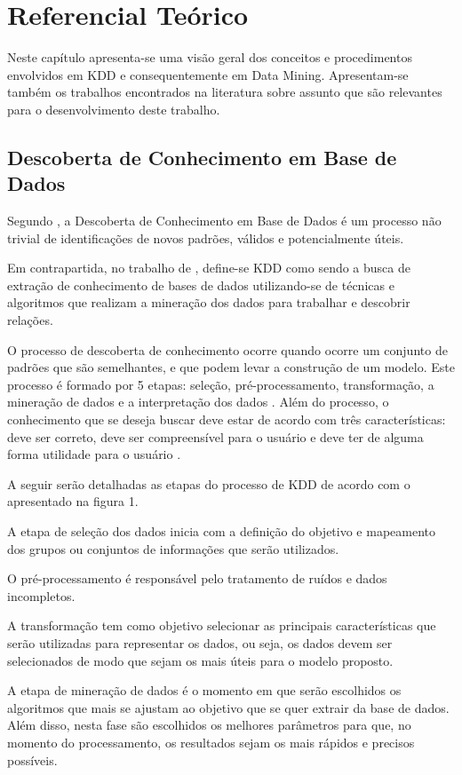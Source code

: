 \documentclass[
	12pt,				%
	openright,			%
	oneside,	
	a4paper,				%
	english,				%
	brazil				%
]{abntex2/abntex2} %
\begin{document}
\chapter{Referencial Teórico}

Neste capítulo apresenta-se uma visão geral dos conceitos e procedimentos envolvidos em KDD e consequentemente em Data Mining. Apresentam-se também os trabalhos encontrados na literatura sobre assunto que são relevantes para o desenvolvimento deste trabalho.

	\section{Descoberta de Conhecimento em Base de Dados}
	
	Segundo \cite{fayyad:1996}, a Descoberta de Conhecimento em Base de Dados é um processo não trivial de identificações de novos padrões, válidos e potencialmente úteis.
	
	Em contrapartida, no trabalho de \cite{thome:2002}, define-se KDD como sendo a busca de extração de conhecimento de bases de dados utilizando-se de técnicas e algoritmos que realizam a mineração dos dados para trabalhar e descobrir relações.
	
	O processo de descoberta de conhecimento ocorre quando ocorre um conjunto de padrões que são semelhantes, e que podem levar a construção de um modelo. Este processo é formado por 5 etapas: seleção, pré-processamento, transformação, a mineração de dados e a interpretação dos dados \cite{fayyad:1996}. Além do processo, o conhecimento que se deseja buscar deve estar de acordo com três características: deve ser correto, deve ser compreensível para o usuário e deve ter de alguma forma utilidade para o usuário \cite{freitas:2000}.
	
	A seguir serão detalhadas as etapas do processo de KDD de acordo com o apresentado na figura 1.
	
	A etapa de seleção dos dados inicia com a definição do objetivo e mapeamento  dos grupos ou conjuntos de informações que serão utilizados.
	
	O pré-processamento é responsável pelo tratamento de ruídos e dados incompletos.
	
	A transformação tem como objetivo selecionar as principais características que serão utilizadas para representar os dados, ou seja, os dados devem ser selecionados de  modo que sejam os mais úteis para o modelo proposto.
	
	A etapa de mineração de dados é o momento em que serão escolhidos os  algoritmos que mais se ajustam ao objetivo que se quer extrair da base de dados. Além disso, nesta fase são escolhidos os melhores parâmetros para que, no momento do processamento, os resultados sejam os mais rápidos e precisos possíveis.
	
\end{document}
